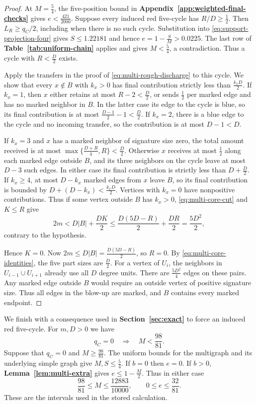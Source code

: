 \documentclass[preprint,11pt,numbers]{elsarticle-arxiv}
\numberwithin{equation}{section}
\theoremstyle{definition}
\begin{document}
\begin{proof}
At $M=\frac54$, the five-position bound in
\textbf{Appendix~\ref{app:weighted-final-checks}} gives
$e<\frac{421}{2000}$. Suppose every induced red five-cycle
has $R/D\geq\frac12$. Then $L_R\geq q_C/2$, including when
there is no such cycle. Substitution into
\eqref{eq:support-projection-four} gives $S\leq1.22181$ and
hence $e=1-\frac{S}{M}>0.0225$. The last row of
\textbf{Table~\ref{tab:uniform-chain}} applies and gives
$M<\frac54$, a contradiction. Thus a cycle with $R<\frac D2$
exists.

Apply the transfers in the proof of \eqref{eq:multi-rough-discharge}
to this cycle. We show that every $x\notin B$ with $k_x>0$ has
final contribution strictly less than $\frac{k_xD}{2}$.
If $k_x=1$, then $x$ either retains at most $R-2<\frac D2$,
or sends $\frac12$ per marked edge and has no marked neighbor
in $B$. In the latter case its edge to the cycle is blue, so
its final contribution is at most $\frac{D-1}{2}-1<\frac D2$.
If $k_x=2$, there is a blue edge to the cycle and no incoming
transfer, so the contribution is at most $D-1<D$.

If $k_x=3$ and $x$ has a marked neighbor of signature size zero,
the total amount received is at most
$\max\{\frac{D+R}{4},R\}<\frac D2$. Otherwise $x$ receives at
most $\frac12$ along each marked edge outside $B$, and its
three neighbors on the cycle leave at most $D-3$ such edges.
In either case its final contribution is strictly less than
$D+\frac D2$. If $k_x\geq4$, at most $D-k_x$ marked edges
from $x$ leave $B$, so its final contribution is bounded by
$D+(D-k_x)<\frac{k_xD}{2}$. Vertices with $k_x=0$ have
nonpositive contributions. Thus if some vertex outside $B$
has $k_x>0$, \eqref{eq:multi-core-cut} and $K\leq R$ give
\[
 2m<D|B|+\frac{DK}{2}
       \leq\frac{D(5D-R)}2+\frac{DR}2=\frac{5D^2}2,
\]
contrary to the hypothesis.

Hence $K=0$. Now $2m\le D|B|=\frac{D(5D-R)}{2}$, so $R=0$.
By \eqref{eq:multi-core-identities}, the five part sizes are
$\frac{D}{2}$. For a vertex of $U_i$, the neighbors in
$U_{i-1}\cup U_{i+1}$ already use all $D$ degree units. There are
$\frac{5D^2}{4}$ edges on these pairs. Any marked edge outside
$B$ would require an outside vertex of positive signature size.
Thus all edges in the blow-up are marked, and $B$ contains every
marked endpoint.
\end{proof}


We finish with a consequence used in \textbf{Section~\ref{sec:exact}}
to force an induced red five-cycle. For $m,D>0$ we have
\begin{equation}\label{eq:absence-red-cycle}
 q_C=0 \quad\Longrightarrow\quad M<\frac{98}{81}.
\end{equation}
Suppose that $q_C=0$ and $M\geq\frac{98}{81}$. The uniform bounds for
the multigraph and its underlying simple graph give $M,S\leq\frac54$.
If $b=0$ then $e=0$. If $b>0$, \textbf{Lemma~\ref{lem:multi-extra}}
gives $e\leq1-\frac{M}{2}$. Thus in either case
\[
 \frac{98}{81}\leq M\leq\frac{12883}{10000},
 \qquad 0\leq e\leq\frac{32}{81}.
\]
These are the intervals used in the stored calculation.
\end{document}
